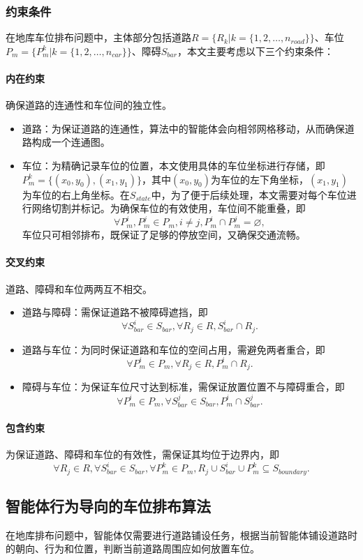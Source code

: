 \subsubsection{约束条件}
在地库车位排布问题中，主体部分包括道路$R=\{R_k|k=\{1,2,\dots,n_{road}\}\}$、车位$P_m=\{P_m^k|k=\{1,2,\dots,n_{car}\}\}$、障碍$S_{bar}$，本文主要考虑以下三个约束条件：
\paragraph{内在约束}确保道路的连通性和车位间的独立性。
\begin{itemize}
    \item 道路：为保证道路的连通性，算法中的智能体会向相邻网格移动，从而确保道路构成一个连通图。
    \item 车位：为精确记录车位的位置，本文使用具体的车位坐标进行存储，即$P_m^k=\{(x_0,y_0),(x_1,y_1)\}$，其中$(x_0,y_0)$为车位的左下角坐标，$(x_1,y_1)$为车位的右上角坐标。在$S_{state}$中，为了便于后续处理，本文需要对每个车位进行网络切割并标记。为确保车位的有效使用，车位间不能重叠，即$$\forall P_m^i,P_m^j \in P_m,i \neq j,P_m^i \cap P_m^j = \varnothing,$$车位只可相邻排布，既保证了足够的停放空间，又确保交通流畅。
\end{itemize}
\paragraph{交叉约束}
道路、障碍和车位两两互不相交。
\begin{itemize}
    \item 道路与障碍：需保证道路不被障碍遮挡，即$$\forall S_{bar}^i \in S_{bar},\forall R_j \in R,S_{bar}^i \cap R_j.$$
    \item 道路与车位：为同时保证道路和车位的空间占用，需避免两者重合，即$$\forall P_m^i \in P_m,\forall R_j \in R,P_m^i \cap R_j.$$
    \item 障碍与车位：为保证车位尺寸达到标准，需保证放置位置不与障碍重合，即$$\forall P_m^i \in P_m,\forall S_{bar}^j \in S_{bar},P_m^i \cap S_{bar}^j.$$
\end{itemize}
\paragraph{包含约束}
为保证道路、障碍和车位的有效性，需保证其均位于边界内，即$$\forall R_j \in R,\forall S_{bar}^i \in S_{bar},\forall P_m^k \in P_m,R_j \cup S_{bar}^i \cup P_m^k \subseteq S_{boundary}.$$
\subsection{智能体行为导向的车位排布算法}
在地库排布问题中，智能体仅需要进行道路铺设任务，根据当前智能体铺设道路时的朝向、行为和位置，判断当前道路周围应如何放置车位。

